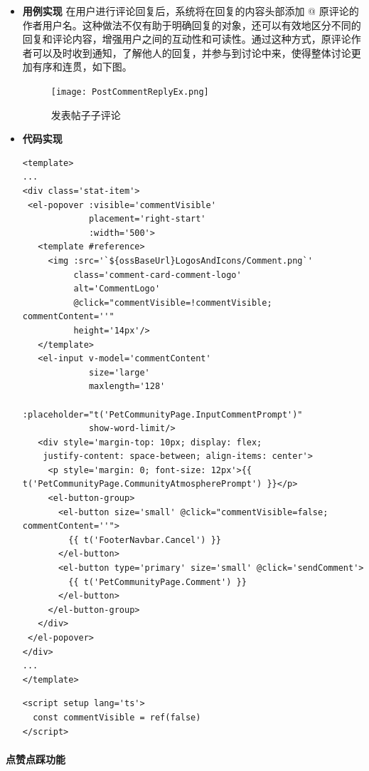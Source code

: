 \begin{itemize}
	\item \textbf{用例实现}
	在用户进行评论回复后，系统将在回复的内容头部添加 @ 原评论的作者用户名。这种做法不仅有助于明确回复的对象，还可以有效地区分不同的回复和评论内容，增强用户之间的互动性和可读性。通过这种方式，原评论作者可以及时收到通知，了解他人的回复，并参与到讨论中来，使得整体讨论更加有序和连贯，如下图。
	
	\begin{figure}[H]
		\centering
		\texttt{[image: PostCommentReplyEx.png]} 
		\caption{发表帖子子评论}
		\label{fig:post-comment-reply-ex}
	\end{figure}
	
	\item \textbf{代码实现}
	\begin{verbatim}
<template>
...
<div class='stat-item'>
 <el-popover :visible='commentVisible'
             placement='right-start'
             :width='500'>
   <template #reference>
     <img :src='`${ossBaseUrl}LogosAndIcons/Comment.png`'
          class='comment-card-comment-logo'
          alt='CommentLogo'
          @click="commentVisible=!commentVisible; commentContent=''"
          height='14px'/>
   </template>
   <el-input v-model='commentContent'
             size='large'
             maxlength='128'
             :placeholder="t('PetCommunityPage.InputCommentPrompt')"
             show-word-limit/>
   <div style='margin-top: 10px; display: flex;
    justify-content: space-between; align-items: center'>
     <p style='margin: 0; font-size: 12px'>{{ t('PetCommunityPage.CommunityAtmospherePrompt') }}</p>
     <el-button-group>
       <el-button size='small' @click="commentVisible=false; commentContent=''">
         {{ t('FooterNavbar.Cancel') }}
       </el-button>
       <el-button type='primary' size='small' @click='sendComment'>
         {{ t('PetCommunityPage.Comment') }}
       </el-button>
     </el-button-group>
   </div>
 </el-popover>
</div>
...
</template>
	\end{verbatim}
	
	\begin{verbatim}
<script setup lang='ts'>
  const commentVisible = ref(false)
</script>
	\end{verbatim}
\end{itemize}

\paragraph{点赞点踩功能}

